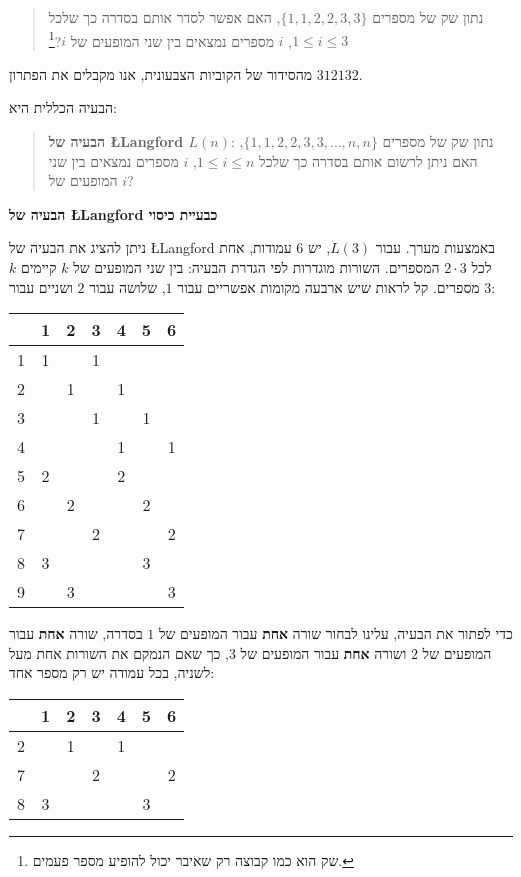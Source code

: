 \documentclass[12pt,a4paper]{article}
\begin{document}
\begin{quote}
נתון שק של מספרים
$\{1,1,2,2,3,3\}$,
האם אפשר לסדר אותם בסדרה כך שלכל
$1\leq i \leq 3$,
$i$
מספרים נמצאים בין שני המופעים של
$i$?\footnote{
שק הוא כמו קבוצה רק שאיבר יכול להופיע מספר פעמים.}
\end{quote}
מהסידור של הקוביות הצבעונית, אנו מקבלים את הפתרון
$312132$.

הבעיה הכללית היא:
\begin{quote}
\textbf{
הבעיה של
\L{Langford} $L(n)$}:
נתון שק של מספרים
$\{1,1,2,2,3,3,\ldots,n,n\}$,
האם ניתן לרשום אותם בסדרה כך שלכל
$1\leq i \leq n$, $i$
מספרים נמצאים בין שני המופעים של
$i$?
\end{quote}

\bigskip

\begin{center}
\textbf{\Large
הבעיה של
\L{Langford}
כבעיית כיסוי}
\end{center}

ניתן להציג את הבעיה של
\L{Langford}
באמצעות מערך. עבור
$L(3)$,
יש
$6$
עמודות, אחת לכל 
$2\cdot 3$
המספרים. השורות מוגדרות לפי הגדרת הבעיה: בין שני המופעים של 
$k$
קיימים
$k$
מספרים. קל לראות שיש ארבעה מקומות אפשריים עבור
$1$,
שלושה עבור
$2$
ושניים עבור
$3$:

\begin{center}
\begin{tabular}{|c||c|c|c|c|c|c|}
\hline
&1&2&3&4&5&6\\\hline\hline
1&1&&1&&&\\\hline
2&&1&&1&&\\\hline
3&&&1&&1&\\\hline
4&&&&1&&1\\\hline
5&2&&&2&&\\\hline
6&&2&&&2&\\\hline
7&&&2&&&2\\\hline
8&3&&&&3&\\\hline
9&&3&&&&3\\\hline
\end{tabular}
\end{center}

כדי לפתור את הבעיה, עלינו לבחור שורה
\textbf{אחת}
עבור המופעים של
$1$
בסדרה, שורה
\textbf{אחת}
עבור המופעים של
$2$
ושורה
\textbf{אחת}
עבור המופעים של
$3$,
כך שאם הנמקם את השורות אחת מעל לשניה, בכל עמודה יש רק מספר אחד:

\begin{center}
\begin{tabular}{|c||c|c|c|c|c|c|}
\hline
&1&2&3&4&5&6\\\hline\hline
2&&1&&1&&\\\hline
7&&&2&&&2\\\hline
8&3&&&&3&\\\hline
\end{tabular}
\end{center}
\end{document}
